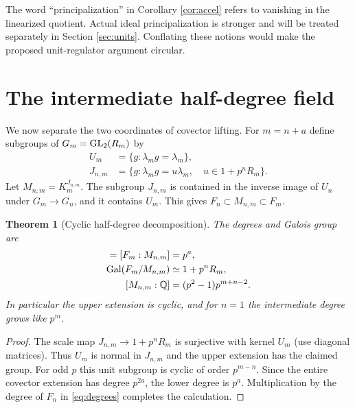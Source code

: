 \documentclass[11pt,a4paper]{article}
\newtheorem{theorem}{Theorem}[section]
\theoremstyle{definition}\newtheorem{definition}[theorem]{Definition}
\theoremstyle{remark}\newtheorem{remark}[theorem]{Remark}
\numberwithin{equation}{section}
\begin{document}
The word ``principalization'' in Corollary \ref{cor:accel} refers to vanishing in the linearized quotient. Actual ideal principalization is stronger and will be treated separately in Section \ref{sec:units}. Conflating these notions would make the proposed unit-regulator argument circular.

\section{The intermediate half-degree field}\label{sec:half}
We now separate the two coordinates of covector lifting. For $m=n+a$ define subgroups of $G_m=\operatorname{GL}_2(R_m)$ by
\begin{align*}
U_m&=\{g:\lambda_mg=\lambda_m\},\\
J_{n,m}&=\{g:\lambda_mg=u\lambda_m,\quad u\in1+p^nR_m\}.
\end{align*}
Let $M_{n,m}=K_m^{J_{n,m}}$. The subgroup $J_{n,m}$ is contained in the inverse image of $U_n$ under $G_m\to G_n$, and it contains $U_m$. This gives $F_n\subset M_{n,m}\subset F_m$.

\begin{theorem}[Cyclic half-degree decomposition]\label{th:field}
The degrees and Galois group are
\begin{align}
[M_{n,m}:F_n]=[F_m:M_{n,m}]&=p^a,\\
\Gal(F_m/M_{n,m})&\simeq 1+p^nR_m,\\
[M_{n,m}:\QQ]&=(p^2-1)p^{m+n-2}.
\end{align}
In particular the upper extension is cyclic, and for $n=1$ the intermediate degree grows like $p^m$.
\end{theorem}
\begin{proof}
The scale map $J_{n,m}\to1+p^nR_m$ is surjective with kernel $U_m$ (use diagonal matrices). Thus $U_m$ is normal in $J_{n,m}$ and the upper extension has the claimed group. For odd $p$ this unit subgroup is cyclic of order $p^{m-n}$. Since the entire covector extension has degree $p^{2a}$, the lower degree is $p^a$. Multiplication by the degree of $F_n$ in \eqref{eq:degrees} completes the calculation.\end{proof}
\end{document}
